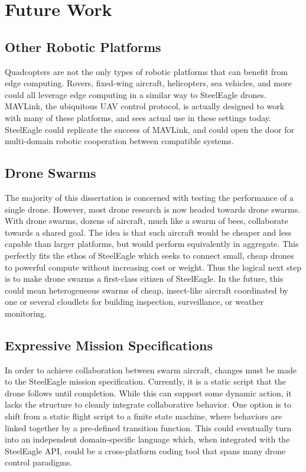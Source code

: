 \section{Future Work}

\subsection{Other Robotic Platforms}
Quadcopters are not the only types of robotic platforms that can benefit from edge computing. Rovers, fixed-wing aircraft, helicopters, sea vehicles, and more could all leverage edge computing in a similar way to SteelEagle drones. MAVLink, the ubiquitous UAV control protocol, is actually designed to work with many of these platforms, and sees actual use in these settings today. SteelEagle could replicate the success of MAVLink, and could open the door for multi-domain robotic cooperation between compatible systems.

\subsection{Drone Swarms}
The majority of this dissertation is concerned with testing the performance of a single drone. However, most drone research is now headed towards drone swarms. With drone swarms, dozens of aircraft, much like a swarm of bees, collaborate towards a shared goal. The idea is that such aircraft would be cheaper and less capable than larger platforms, but would perform equivalently in aggregate. This perfectly fits the ethos of SteelEagle which seeks to connect small, cheap drones to powerful compute without increasing cost or weight. Thus the logical next step is to make drone swarms a first-class citizen of SteelEagle. In the future, this could mean heterogeneous swarms of cheap, insect-like aircraft coordinated by one or several cloudlets for building inspection, surveillance, or weather monitoring.

\subsection{Expressive Mission Specifications}
In order to achieve collaboration between swarm aircraft, changes must be made to the SteelEagle mission specification. Currently, it is a static script that the drone follows until completion. While this can support some dynamic action, it lacks the structure to cleanly integrate collaborative behavior. One option is to shift from a static flight script to a finite state machine, where behaviors are linked together by a pre-defined transition function. This could eventually turn into an independent domain-specific language which, when integrated with the SteelEagle API, could be a cross-platform coding tool that spans many drone control paradigms.

